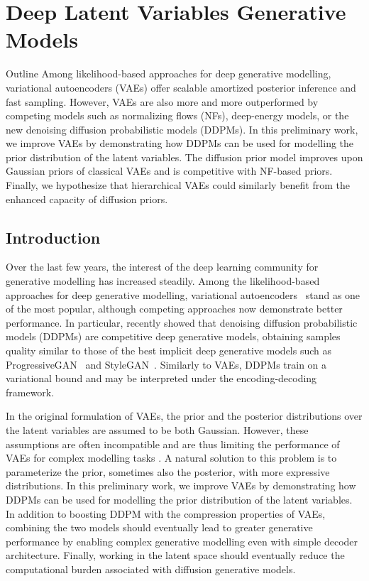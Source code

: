 \chapter{Deep Latent Variables Generative Models}\label{ch:03}

\begin{remark}{Outline}
Among likelihood-based approaches for deep generative modelling, variational autoencoders (VAEs) offer scalable amortized posterior inference and fast sampling. However, VAEs are also more and more outperformed by competing models such as normalizing flows (NFs), deep-energy models, or the new denoising diffusion probabilistic models (DDPMs).
In this preliminary work, we improve VAEs by demonstrating how DDPMs can be used for modelling the prior distribution of the latent variables. The diffusion prior model improves upon Gaussian priors of classical VAEs and is competitive with NF-based priors.
Finally, we hypothesize that hierarchical VAEs could similarly benefit from the enhanced capacity of diffusion priors.
\end{remark}

\section{Introduction}
Over the last few years, the interest of the deep learning community for generative modelling has increased steadily.
Among the likelihood-based approaches for deep generative modelling, variational autoencoders~\citep[VAEs]{VAEs} stand as one of the most popular, although competing approaches now demonstrate better performance.
In particular, \citet{DDPM,IDDPM,dhariwal2021diffusion} recently showed that denoising diffusion probabilistic models (DDPMs) are competitive deep generative models, obtaining samples quality similar to those of the best implicit deep generative models such as ProgressiveGAN~\citep{PGANs} and StyleGAN~\citep{karras2019style}.
Similarly to VAEs, DDPMs train on a variational bound and may be interpreted under the encoding-decoding framework.

In the original formulation of VAEs, the prior and the posterior distributions over the latent variables are assumed to be both Gaussian.
However, these assumptions are often incompatible and are thus limiting the performance of VAEs for complex modelling tasks \citep{vamprior, t_beta_vae}.
A natural solution to this problem is to parameterize the prior, sometimes also the posterior, with more expressive distributions. In this preliminary work, we improve VAEs by demonstrating how DDPMs can be used for modelling the prior distribution of the latent variables. In addition to boosting DDPM with the compression properties of VAEs, combining the two models should eventually lead to greater generative performance by enabling complex generative modelling even with simple decoder architecture. Finally, working in the latent space should eventually reduce the computational burden associated with diffusion generative models.

